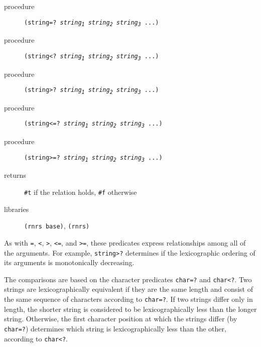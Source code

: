 \begin{description}

\label{objects_s215}\item[procedure] \texttt{(string=? \textit{string\textsubscript{1}} \textit{string\textsubscript{2}} \textit{string\textsubscript{3}} ...)}



\item[procedure] \texttt{(string\textless{}? \textit{string\textsubscript{1}} \textit{string\textsubscript{2}} \textit{string\textsubscript{3}} ...)}



\item[procedure] \texttt{(string\textgreater{}? \textit{string\textsubscript{1}} \textit{string\textsubscript{2}} \textit{string\textsubscript{3}} ...)}



\item[procedure] \texttt{(string\textless{}=? \textit{string\textsubscript{1}} \textit{string\textsubscript{2}} \textit{string\textsubscript{3}} ...)}



\item[procedure] \texttt{(string\textgreater{}=? \textit{string\textsubscript{1}} \textit{string\textsubscript{2}} \textit{string\textsubscript{3}} ...)}



\item[returns] \texttt{\#{}t} if the relation holds, \texttt{\#{}f} otherwise


\item[libraries] \texttt{(rnrs base)}, \texttt{(rnrs)}
\end{description}


As with \texttt{=}, \texttt{\textless{}}, \texttt{\textgreater{}}, \texttt{\textless{}=}, and \texttt{\textgreater{}=}, these predicates
express relationships among all of the arguments.
For example, \texttt{string\textgreater{}?} determines if the lexicographic ordering
of its arguments is monotonically decreasing.


The comparisons are based on the character predicates \texttt{char=?}
and \texttt{char\textless{}?}.
Two strings are lexicographically equivalent if they are the same length
and consist of the same sequence of characters according to \texttt{char=?}.
If two strings differ only in length, the shorter string is considered to
be lexicographically less than the longer string.
Otherwise, the first character position at which the strings differ (by \texttt{char=?})
determines which string is lexicographically less than the other, according
to \texttt{char\textless{}?}.


